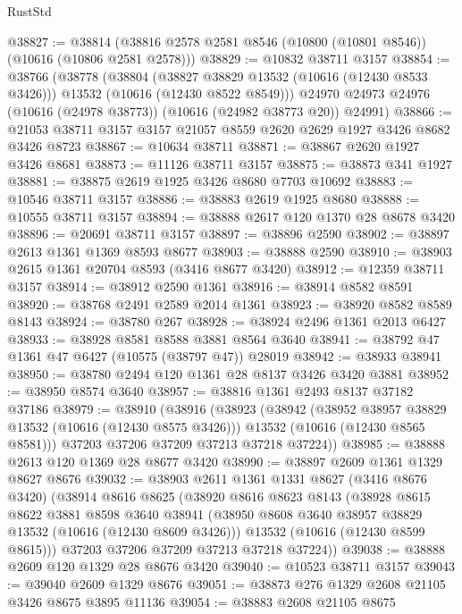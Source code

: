 \begin{lexlean}{RustStd}
\begin{coremodule}
@38827 := @38814 (@38816 @2578 @2581 @8546 (@10800 (@10801 @8546)) (@10616 (@10806 @2581 @2578)))
@38829 := @10832 @38711 @3157
@38854 := @38766
    (@38778
      (@38804
        (@38827 @38829 @13532 (@10616 (@12430 @8533 @3426)))
        @13532
        (@10616 (@12430 @8522 @8549)))
      @24970
      @24973
      @24976
      (@10616 (@24978 @38773))
      (@10616 (@24982 @38773 @20))
      @24991)
@38866 := @21053 @38711 @3157 @3157 @21057 @8559 @2620 @2629 @1927 @3426 @8682 @3426 @8723
@38867 := @10634 @38711
@38871 := @38867 @2620 @1927 @3426 @8681
@38873 := @11126 @38711 @3157
@38875 := @38873 @341 @1927
@38881 := @38875 @2619 @1925 @3426 @8680 @7703 @10692
@38883 := @10546 @38711 @3157
@38886 := @38883 @2619 @1925 @8680
@38888 := @10555 @38711 @3157
@38894 := @38888 @2617 @120 @1370 @28 @8678 @3420
@38896 := @20691 @38711 @3157
@38897 := @38896 @2590
@38902 := @38897 @2613 @1361 @1369 @8593 @8677
@38903 := @38888 @2590
@38910 := @38903 @2615 @1361 @20704 @8593 (@3416 @8677 @3420)
@38912 := @12359 @38711 @3157
@38914 := @38912 @2590 @1361
@38916 := @38914 @8582 @8591
@38920 := @38768 @2491 @2589 @2014 @1361
@38923 := @38920 @8582 @8589 @8143
@38924 := @38780 @267
@38928 := @38924 @2496 @1361 @2013 @6427
@38933 := @38928 @8581 @8588 @3881 @8564 @3640
@38941 := @38792 @47 @1361 @47 @6427 (@10575 (@38797 @47)) @28019
@38942 := @38933 @38941
@38950 := @38780 @2494 @120 @1361 @28 @8137 @3426 @3420 @3881
@38952 := @38950 @8574 @3640
@38957 := @38816 @1361 @2493 @8137 @37182 @37186
@38979 := @38910
    (@38916
      (@38923
        (@38942
          (@38952 @38957 @38829 @13532 (@10616 (@12430 @8575 @3426)))
          @13532
          (@10616 (@12430 @8565 @8581)))
        @37203
        @37206
        @37209
        @37213
        @37218
        @37224))
@38985 := @38888 @2613 @120 @1369 @28 @8677 @3420
@38990 := @38897 @2609 @1361 @1329 @8627 @8676
@39032 := @38903
    @2611
    @1361
    @1331
    @8627
    (@3416 @8676 @3420)
    (@38914
      @8616
      @8625
      (@38920
        @8616
        @8623
        @8143
        (@38928
          @8615
          @8622
          @3881
          @8598
          @3640
          @38941
          (@38950 @8608 @3640 @38957 @38829 @13532 (@10616 (@12430 @8609 @3426)))
          @13532
          (@10616 (@12430 @8599 @8615)))
        @37203
        @37206
        @37209
        @37213
        @37218
        @37224))
@39038 := @38888 @2609 @120 @1329 @28 @8676 @3420
@39040 := @10523 @38711 @3157
@39043 := @39040 @2609 @1329 @8676
@39051 := @38873 @276 @1329 @2608 @21105 @3426 @8675 @3895 @11136
@39054 := @38883 @2608 @21105 @8675

\end{coremodule}
\end{lexlean}
